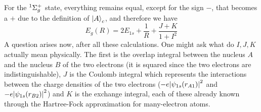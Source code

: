 \documentclass[../qm.tex]{subfiles}
\begin{document}
	For the $\term[g]{\Sigma^+}{1}$ state, everything remains equal, except for the sign $-$, that becomes a $+$ due to the definition of $\ket{A}_c$, and therefore we have
	\begin{equation}
		E_g(R)=2E_{1s}+\frac{1}{R}+\frac{J+K}{1+I^2}
		\label{eq:geradeenergyketa}
	\end{equation}
	A question arises now, after all these calculations. One might ask what do $I,J,K$ actually mean physically. The first is the overlap integral between the nucleus $A$ and the nucleus $B$ of the two electrons (it is squared since the two electrons are indistinguishable), $J$ is the Coulomb integral which represents the interactions between the charge densities of the two electrons ($-e\abs{\psi_{1s}(r_{A1})}^2$ and $-e\abs{\psi_{1s}(r_{B2})}^2$) and $K$ is the exchange integral, each of these already known through the Hartree-Fock approximation for many-electron atoms.
\end{document}
